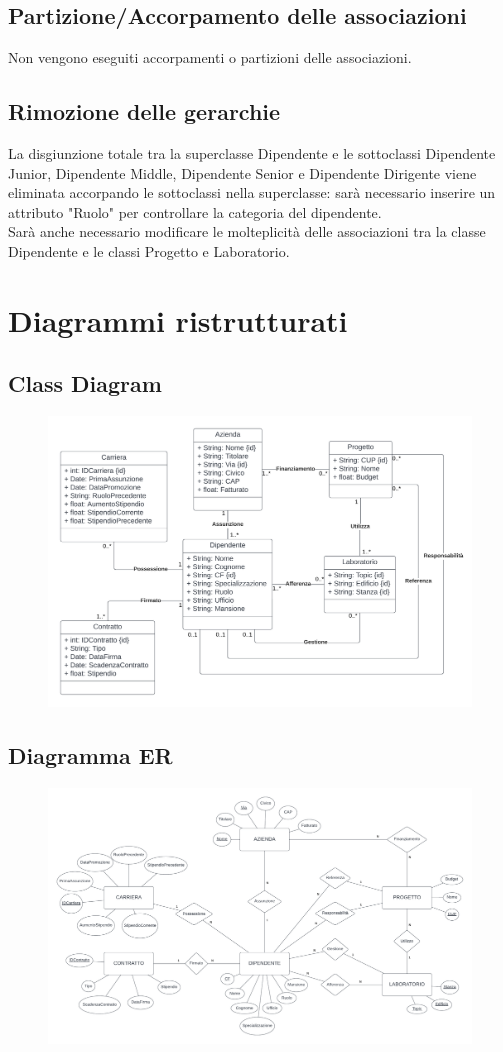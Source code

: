 \subsection{Partizione/Accorpamento delle associazioni}
Non vengono eseguiti accorpamenti o partizioni delle associazioni.

\subsection{Rimozione delle gerarchie}
La disgiunzione totale tra la superclasse Dipendente e le sottoclassi Dipendente Junior, Dipendente Middle, Dipendente Senior e Dipendente Dirigente viene eliminata accorpando le sottoclassi nella superclasse: sarà necessario inserire un attributo "Ruolo" per controllare la categoria del dipendente.\\
Sarà anche necessario modificare le molteplicità delle associazioni tra la classe Dipendente e le classi Progetto e Laboratorio.
\newpage
\section{Diagrammi ristrutturati}
\subsection{Class Diagram}
\begin{figure}[!h]
    \includegraphics[width=.8\linewidth]{./Immagini/Ristrutturato.png}
\end{figure}
\subsection{Diagramma ER}
\begin{figure}[!h]
    \includegraphics[width=.8\linewidth]{./Immagini/ER.png}
\end{figure}